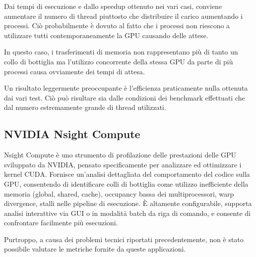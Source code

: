 Dai tempi di esecuzione e dallo speedup ottenuto nei vari casi, conviene aumentare il numero di thread piuttosto che distribuire il carico aumentando i processi. Ciò probabilmente è dovuto al fatto che i processi non riescono a utilizzare tutti contemporaneamente la GPU causando delle attese.

In questo caso, i trasferimenti di memoria non rappresentano più di tanto un collo di bottiglia ma l'utilizzo concorrente della stessa GPU da parte di più processi causa ovviamente dei tempi di attesa.

Un risultato leggermente preoccupante è l'efficienza praticamente nulla ottenuta dai vari test. Ciò può risultare sia dalle condizioni dei benchmark effettuati che dal numero estremamente grande di thread utilizzati.

\subsection{NVIDIA Nsight Compute}

Nsight Compute è uno strumento di profilazione delle prestazioni delle GPU sviluppato da NVIDIA, pensato specificamente per analizzare ed ottimizzare i kernel CUDA. Fornisce un'analisi dettagliata del comportamento del codice sulla GPU, consentendo di identificare colli di bottiglia come utilizzo inefficiente della memoria (global, shared, cache), occupancy bassa dei multiprocessori, warp divergence, stalli nelle pipeline di esecuzione. È altamente configurabile, supporta analisi interattive via GUI o in modalità batch da riga di comando, e consente di confrontare facilmente più esecuzioni.

Purtroppo, a causa dei problemi tecnici riportati precedentemente, non è stato possibile valutare le metriche fornite da queste applicazioni.
